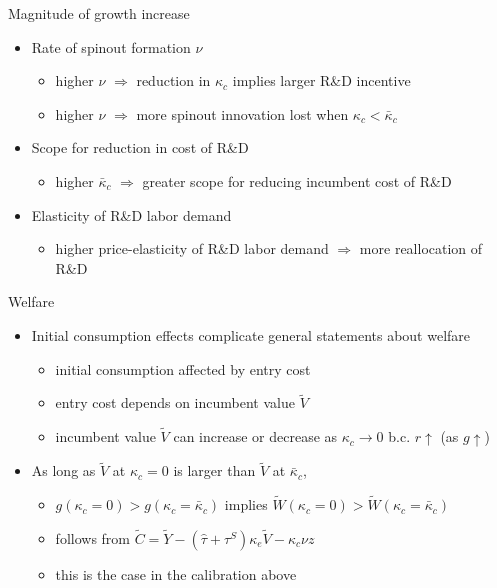 \documentclass[english,usenames,dvipsnames]{beamer}
\begin{document}
\begin{frame}{Magnitude of growth increase}\label{magnitude_of_growth_increase}
	\hyperlink{reducing_kappa_c_intuition_overview}{}
	\begin{itemize}
		\item <+-> Rate of spinout formation $\nu$
		\begin{itemize}
			\item higher $\nu$ $\Rightarrow$ reduction in $\kappa_c$ implies larger R\&D incentive
			\item higher $\nu$ $\Rightarrow$ more spinout innovation lost when $\kappa_c < \bar{\kappa}_c$ 
		\end{itemize}
		\medskip
		\item <+-> Scope for reduction in cost of R\&D
		\begin{itemize}
			\item higher $\bar{\kappa}_c$ $\Rightarrow$ greater scope for reducing incumbent cost of R\&D
		\end{itemize}
		\medskip
		\item <+-> Elasticity of R\&D labor demand 
		\begin{itemize}
			\item higher price-elasticity of R\&D labor demand $\Rightarrow$ more reallocation of R\&D
		\end{itemize}
	\end{itemize}
\end{frame}

\begin{frame}{Welfare}\label{welfare_details}
	\hyperlink{reducing_kappa_c_table}{}
	\begin{itemize}
		\item Initial consumption effects complicate general statements about welfare
		\begin{itemize}
			\item initial consumption affected by entry cost
			\item entry cost depends on incumbent value $\tilde{V}$ 
			\item incumbent value $\tilde{V}$ can increase or decrease as $\kappa_c \to 0$ b.c. $r \uparrow$ (as $g \uparrow$)
		\end{itemize}
		\medskip
		\item As long as $\tilde{V}$ at $\kappa_c = 0$ is larger than $\tilde{V}$ at $\bar{\kappa}_c$,
		\begin{itemize}
			\item $g(\kappa_c = 0) > g(\kappa_c = \bar{\kappa}_c)$ implies $\tilde{W}(\kappa_c = 0) > \tilde{W}(\kappa_c = \bar{\kappa}_c)$
			\smallskip
			\item follows from $\tilde{C} = \tilde{Y} - (\hat{\tau} + \tau^S)\kappa_e \tilde{V} - \kappa_c \nu z$
			\item this is the case in the calibration above
		\end{itemize}
	\end{itemize}
\end{frame}
\end{document}
